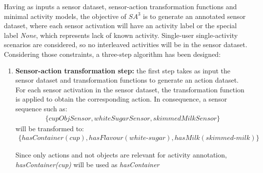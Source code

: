 Having as inputs a sensor dataset, sensor-action transformation functions and minimal activity models, the objective of $SA^3$ is to generate an annotated sensor dataset, where each sensor activation will have an activity label or the special label \textit{None}, which represents lack of known activity. Single-user single-activity scenarios are considered, so no interleaved activities will be in the sensor dataset. Considering those constraints, a three-step algorithm has been designed:

\begin{enumerate}
 \item \textbf{Sensor-action transformation step:} the first step takes as input the sensor dataset and transformation functions to generate an action dataset. For each sensor activation in the sensor dataset, the transformation function is applied to obtain the corresponding action. In consequence, a sensor sequence such as:
 \begin{equation*}
 \begin{split}
   \{cupObjSensor, whiteSugarSensor, skimmedMilkSensor\}
 \end{split}  
 \end{equation*}
 will be transformed to:
 \begin{equation*}
 \begin{split}
  \{hasContainer(cup), hasFlavour(white\text{-}sugar), hasMilk(skimmed\text{-}milk)\}
 \end{split}   
 \end{equation*}
 
Since only actions and not objects are relevant for activity annotation, \textit{hasContainer(cup)} will be used as \textit{hasContainer} 


\end{enumerate}
